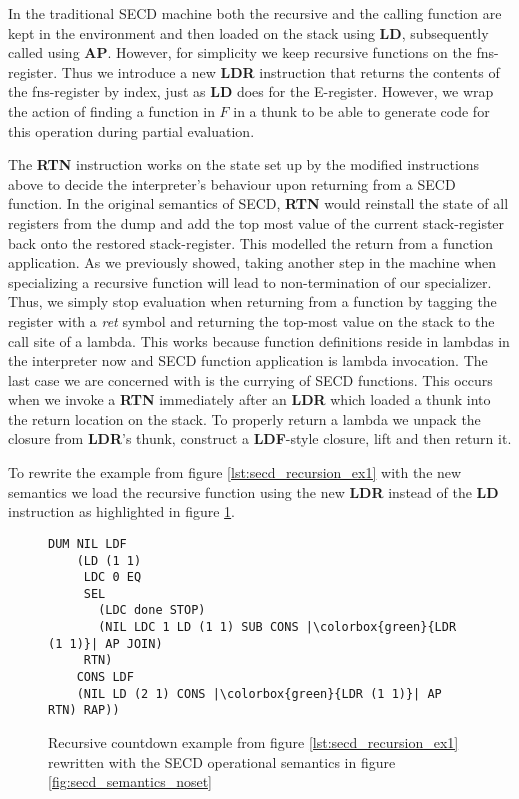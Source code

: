 \documentclass[a4paper,12pt,twoside,openright]{report}
\theoremstyle{definition}
\newcommand{\ts}{\textquotesingle}
\begin{document}
In the traditional SECD machine both the recursive and the calling function are kept in the environment and then loaded on the stack using \textbf{LD}, subsequently called using \textbf{AP}. However, for simplicity we keep recursive functions on the fns-register. Thus we introduce a new \textbf{LDR} instruction that returns the contents of the fns-register by index, just as \textbf{LD} does for the E-register. However, we wrap the action of finding a function in $F$ in a thunk to be able to generate code for this operation during partial evaluation.

The \textbf{RTN} instruction works on the state set up by the modified instructions above to decide the interpreter's behaviour upon returning from a SECD function. In the original semantics of SECD, \textbf{RTN} would reinstall the state of all registers from the dump and add the top most value of the current stack-register back onto the restored stack-register. This modelled the return from a function application. As we previously showed, taking another step in the machine when specializing a recursive function will lead to non-termination of our specializer. Thus, we simply stop evaluation when returning from a function by tagging the register with a \textit{{\ts}ret} symbol and returning the top-most value on the stack to the call site of a lambda. This works because function definitions reside in lambdas in the interpreter now and SECD function application is lambda invocation. The last case we are concerned with is the currying of SECD functions. This occurs when we invoke a \textbf{RTN} immediately after an \textbf{LDR} which loaded a thunk into the return location on the stack. To properly return a lambda we unpack the closure from \textbf{LDR}'s thunk, construct a \textbf{LDF}-style closure, lift and then return it.


To rewrite the example from figure \ref{lst:secd_recursion_ex1} with the new semantics we load the recursive function using the new \textbf{LDR} instead of the \textbf{LD} instruction as highlighted in figure \ref{lst:secd_recursion_ex1_newsem}.

\begin{figure}[ht]
\begin{verbatim}
DUM NIL LDF
    (LD (1 1)
     LDC 0 EQ
     SEL
       (LDC done STOP)
       (NIL LDC 1 LD (1 1) SUB CONS |\colorbox{green}{LDR (1 1)}| AP JOIN)
     RTN)
    CONS LDF
    (NIL LD (2 1) CONS |\colorbox{green}{LDR (1 1)}| AP RTN) RAP))
\end{verbatim}
\caption{Recursive countdown example from figure \ref{lst:secd_recursion_ex1} rewritten with the SECD operational semantics in figure \ref{fig:secd_semantics_noset}}
\label{lst:secd_recursion_ex1_newsem}
\end{figure}
\end{document}
